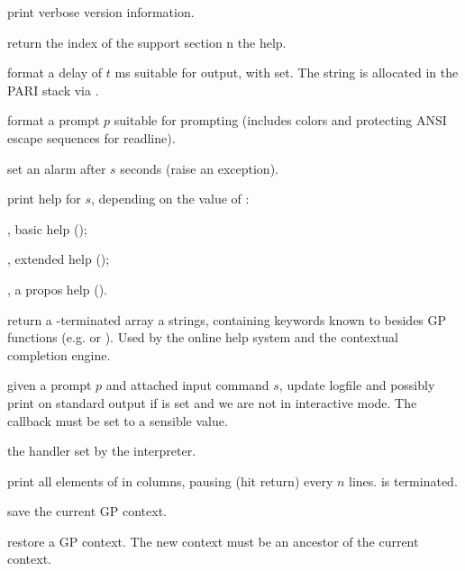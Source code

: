  print verbose version information.

 return the index of the support section
n the help.

 format a delay of $t$ ms
suitable for  output, with  set. The string is allocated
in the PARI stack via .

 format a prompt $p$
suitable for  prompting (includes colors and protecting ANSI escape
sequences for readline).

 set an alarm after $s$ seconds (raise an
 exception).

 print help for $s$, depending
on the value of \fl:

\item {}, basic help ();

\item {}, extended help ();

\item {}, a propos help ().

 return a
-terminated array a strings, containing keywords known to
 besides GP functions (e.g.  or ).
Used by the online help system and the contextual completion engine.

 given a prompt
$p$ and attached input command $s$, update logfile and possibly
print on standard output if  is set and we are not in interactive
mode. The callback  must be set to a sensible
value.

 the  handler
set by the  interpreter.

print all elements of  in columns, pausing (hit return)
every $n$ lines.  is  terminated.


 save the current GP
context.

 restore a GP context.
The new context must be an ancestor of the current context.

